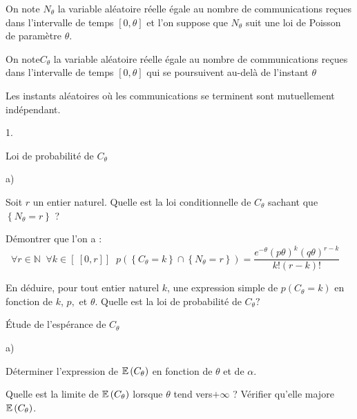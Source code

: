 \documentclass[11pt]{article}%
\begin{document}
On note $N_{\theta }$ la variable aléatoire réelle égale au
nombre de communications reçues dans l'intervalle de temps $\left[
0,\theta \right] $ et l'on suppose que $N_{\theta }$ suit une loi de
Poisson
de paramètre $\theta $.

On note$C_{\theta }$ la variable aléatoire réelle égale au
nombre de communications reçues dans l'intervalle de temps $\left[
0,\theta \right] $ qui se poursuivent au-delà de l'instant $\theta $

Les instants aléatoires où les communications se terminent sont
mutuellement indépendant.

\begin{noliste}{1.}
 \setlength{\itemsep}{4mm}
\item Loi de probabilité de $C_{\theta }$

\begin{noliste}{a)}
 \setlength{\itemsep}{2mm}
\item Soit $r$ un entier naturel. Quelle est la loi conditionnelle de
$C_{\theta }$ sachant que $\left\{ N_{\theta } = r\right\} $ ?

\item Démontrer que l'on a : 
\[
\forall r\in \mathbb{N\;\;\forall }k\in \left[ \ \left[ 0,r\right]
\right]
\;\;p\left( \left\{ C_{\theta } = k\right\} \cap \left\{ N_{\theta } =
r\right\}
\right) = \frac{e^{-\theta }\left( p\theta \right) ^{k}\left( q\theta
\right) ^{r-k}}{k!\left( r-k\right) !}\;\;\; 
\]

\item En déduire, pour tout entier naturel $k$, une expression simple
de 
$p\left( C_{\theta } = k\right) $ en fonction de $k$, $p,$ et $\theta
$.
Quelle est la loi de probabilité de $C_{\theta } ?$
\end{noliste}

\item Étude de l'espérance de $C_{\theta }$

\begin{noliste}{a)}
 \setlength{\itemsep}{2mm}
\item Déterminer l'expression de $\mathbb{E}\left( C_{\theta }\right) $ en
fonction de $\theta $ et de $\alpha $.

\item Quelle est la limite de $\mathbb{E}\left( C_{\theta }\right) $ lorsque
$\theta $
tend vers$ + \infty $ ? Vérifier qu'elle majore $\mathbb{E}\left( C_{\theta
}\right) $.
\end{noliste}
\end{noliste}
\end{document}
